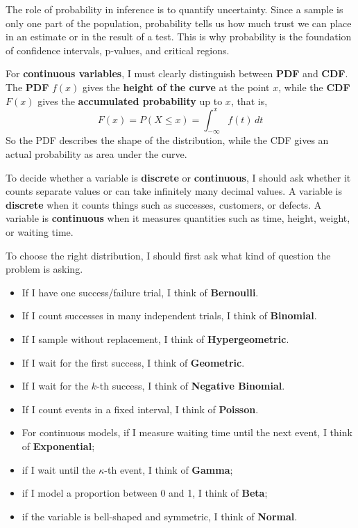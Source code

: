 \documentclass[11pt]{article}
\theoremstyle{smallexample}
\newcommand{\vs}{\vspace{0.2\baselineskip}}
\begin{document}
The role of probability in inference is to quantify uncertainty. Since a sample is only one part of the population, probability tells us how much trust we can place in an estimate or in the result of a test. This is why probability is the foundation of confidence intervals, p-values, and critical regions.

For \textbf{continuous variables}, I must clearly distinguish between \textbf{PDF} and \textbf{CDF}. The \textbf{PDF} \(f(x)\) gives the \textbf{height of the curve} at the point \(x\), while the \textbf{CDF} \(F(x)\) gives the \textbf{accumulated probability} up to \(x\), that is,
\[
F(x)=P(X\le x)=\int_{-\infty}^{x} f(t)\,dt
\]
So the PDF describes the shape of the distribution, while the CDF gives an actual probability as area under the curve. 

To decide whether a variable is \textbf{discrete} or \textbf{continuous}, I should ask whether it counts separate values or can take infinitely many decimal values. A variable is \textbf{discrete} when it counts things such as successes, customers, or defects. A variable is \textbf{continuous} when it measures quantities such as time, height, weight, or waiting time.

To choose the right distribution, I should first ask what kind of question the problem is asking. 
\begin{itemize}
    \item If I have one success/failure trial, I think of \textbf{Bernoulli}. 
    \item If I count successes in many independent trials, I think of \textbf{Binomial}. 
    \item If I sample without replacement, I think of \textbf{Hypergeometric}. 
    \item  If I wait for the first success, I think of \textbf{Geometric}. 
    \item If I wait for the \(k\)-th success, I think of \textbf{Negative Binomial}. 
    \item If I count events in a fixed interval, I think of \textbf{Poisson}. 
\end{itemize}

\vs
\begin{itemize}

    \item For continuous models, if I measure waiting time until the next event, I think of \textbf{Exponential};
    \item  if I wait until the \(\kappa\)-th event, I think of \textbf{Gamma}; 
    \item if I model a proportion between 0 and 1, I think of \textbf{Beta};
    \item  if the variable is bell-shaped and symmetric, I think of \textbf{Normal}. 

\end{itemize}
\end{document}
